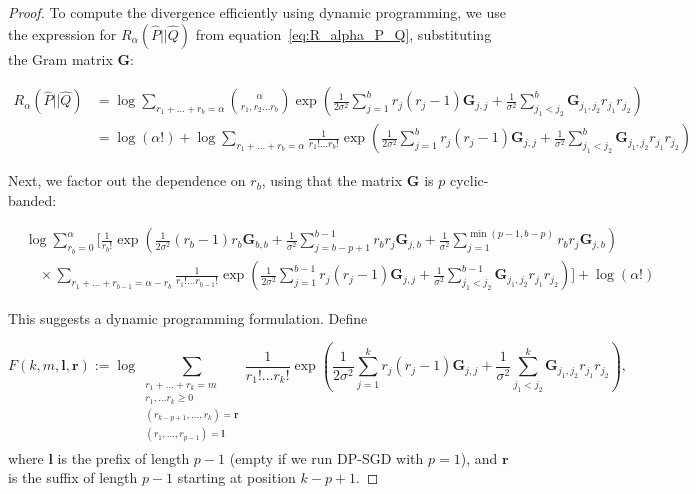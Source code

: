 \documentclass{article}
\theoremstyle{plain}
\theoremstyle{definition}
\theoremstyle{remark}
\begin{document}
\RenyiDynamicProgram*
\begin{proof}
    
To compute the divergence efficiently using dynamic programming, we use the expression for $R_{\alpha}(\hat{P}||\hat{Q})$ from equation~\eqref{eq:R_alpha_P_Q}, substituting the Gram matrix $\mathbf{G}$:

\begin{align}
\label{eq:r_alpha_p_q_appendix}
     R_\alpha(\hat{P} || \hat{Q}) &= \log   \sum_{r_1 + \dots  + r_b = \alpha}
    \binom{\alpha}{r_1, r_2 \dots r_{b}}
    \exp\left(
        \frac{1 }{2 \sigma^2} \sum_{j=1}^{b}r_{j}(r_{j} - 1) \mathbf{G}_{j, j} + \frac{1}{\sigma^2}\sum_{j_1 < j_2}^{b} \mathbf{G}_{j_1, j_2}r_{j_1}r_{j_2}
    \right)\\
    & = \log (\alpha!) + \log   \sum_{r_1 + \dots  + r_b = \alpha}
    \frac{1}{r_1! \dots r_{b}!}
    \exp\left(
        \frac{1 }{2 \sigma^2} \sum_{j=1}^{b}r_{j}(r_{j} - 1) \mathbf{G}_{j, j} + \frac{1}{\sigma^2}\sum_{j_1 < j_2}^{b} \mathbf{G}_{j_1, j_2}r_{j_1}r_{j_2}
    \right)
\end{align}

Next, we factor out the dependence on $r_b$, using that the matrix $\mathbf{G}$ is $p$ cyclic-banded:

\begin{align}
     &\log \sum\limits_{r_b = 0}^{\alpha}\Bigg[\frac{1}{r_{b}!} \exp\left(\frac{1}{2\sigma^2}(r_{b} - 1)r_b \mathbf{G}_{b, b} + \frac{1}{\sigma^2}\sum\limits_{j = b - p + 1}^{b - 1}r_{b} r_{j}\mathbf{G}_{j, b} + \frac{1}{\sigma^2}\sum\limits_{j = 1}^{\min(p - 1, b - p)}r_{b} r_{j}\mathbf{G}_{j, b}\right) \\
     &\quad \times \sum_{r_1 + \dots  + r_{b-1} = \alpha - r_b}
    \frac{1}{r_1! \dots r_{b - 1}!}
    \exp\left(
        \frac{1}{2 \sigma^2} \sum_{j=1}^{b - 1}r_{j}(r_{j} - 1) \mathbf{G}_{j, j} + \frac{1}{\sigma^2}\sum_{j_1 < j_2}^{b -1} \mathbf{G}_{j_1, j_2}r_{j_1}r_{j_2}
    \right)\Bigg] + \log (\alpha!)
\end{align}

This suggests a dynamic programming formulation. Define

\begin{equation}
    F(k, m, \mathbf{l}, \mathbf{r}) := \log \sum\limits_{\substack{r_1 + \dots + r_{k} = m\\ r_1, \dots r_k \ge 0\\ (r_{k - p +1}, \dots, r_{k}) = \mathbf{r}\\
    (r_1, \dots, r_{p - 1}) = \mathbf{l}\\}}\frac{1}{r_1! \dots r_{k}!}
    \exp\left(
        \frac{1 }{2 \sigma^2} \sum_{j=1}^{k}r_{j}(r_{j} - 1) \mathbf{G}_{j, j} + \frac{1}{\sigma^2}\sum_{j_1 < j_2}^{k} \mathbf{G}_{j_1, j_2}r_{j_1}r_{j_2}
    \right),
\end{equation}
where $\mathbf{l}$ is the prefix of length $p-1$ (empty if we run DP-SGD with $p=1$), and $\mathbf{r}$ is the suffix of length $p-1$ starting at position $k-p+1$.




\end{proof}
\end{document}
